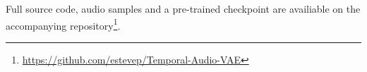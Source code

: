 \documentclass{article}
\begin{document}
Full source code, audio samples and a pre-trained checkpoint are availiable on the accompanying repository\footnote{\url{https://github.com/estevep/Temporal-Audio-VAE}}.



\end{document}

